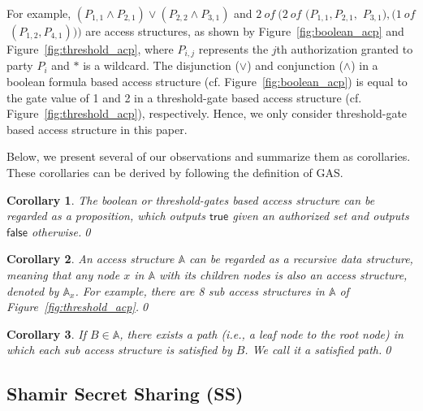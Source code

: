 \documentclass[runningheads]{llncs}
\newtheorem{myCor}{Corollary}
\newcommand{\true}{\textsf{true}}
\newcommand{\false}{\textsf{false}}
\begin{document}
For example, $(P_{1,1} \wedge P_{2,1}) \vee (P_{2,2} \wedge P_{3,1})$ and $2\ of\ (2\ of$ $(P_{1,1}, P_{2,1},$ $ P_{3,1}), (1\ of$ $\ (P_{1,2}, P_{4,1})))$ are access structures, as shown by Figure~\ref{fig:boolean_acp} and Figure~\ref{fig:threshold_acp}, where $P_{i,j}$ represents the $j$th authorization granted to party $P_i$ and $*$ is a wildcard. The disjunction ($\vee$) and conjunction ($\wedge$) in a boolean formula based access structure (cf. Figure~\ref{fig:boolean_acp}) is equal to the gate value of 1 and 2 in a threshold-gate based access structure (cf. Figure~\ref{fig:threshold_acp}), respectively. Hence, we only consider threshold-gate based access structure in this paper.

Below, we present several of our observations and summarize them as corollaries. These corollaries can be derived by following the definition of GAS.


\begin{myCor}\label{cor:as_proposition}
    The boolean or threshold-gates based access structure can be regarded as a proposition, which outputs $\true$ given an authorized set and outputs $\false$ otherwise.\qed
\end{myCor}

\begin{myCor}
    An access structure $\mathbb{A}$ can be regarded as a recursive data structure, meaning that any node $x$ in $\mathbb{A}$ with its children nodes is also an access structure, denoted by $\mathbb{A}_x$. For example, there are 8 sub access structures in $\mathbb{A}$ of Figure~\ref{fig:threshold_acp}.\qed
\end{myCor}

\begin{myCor}\label{cor:satisfied_path}
    If $B\in \mathbb{A}$, there exists a path (i.e., a leaf node to the root node) in which each sub access structure is satisfied by $B$. We call it a satisfied path.\qed
\end{myCor}


\subsection{Shamir Secret Sharing (SS)}
\end{document}
